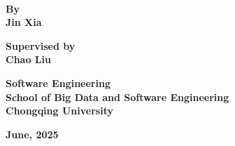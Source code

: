 \documentclass[UTF8,a4paper,12pt]{ctexart}
\numberwithin{equation}{section}
\begin{document}
~\\
\renewcommand{\headrulewidth}{1pt}
\begin{figure}[htb] 
  \centering
     \end{figure}
     

\setmainfont{Times New Roman}
\begin{center}
\textbf{By}  \\
\textbf{Jin Xia}
\end{center}

\begin{center}
\textbf{Supervised by}\\
\textbf{Chao Liu}\\
\end{center}

\begin{center}
\textbf{Software Engineering}\\ %
\textbf{	School of Big Data and Software Engineering}\\ %
\textbf{Chongqing University}
\end{center}

\begin{center}
\textbf{June, 2025}
\end{center}


\newpage
\pagestyle{fancy}




\end{document}
